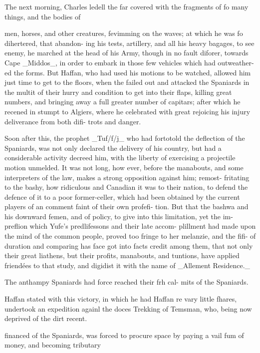 \documentclass{article}
\begin{document}
The next morning, Charles ledell the far covered with the fragments of fo many things, and the bodies of

men, horses, and other creatures, fevimming on the waves; at which he was fo dihertered, that abandon- ing his tests, artillery, and all his heavy bagages, to see enemy, he marched at the head of his Army, though in no fault diforer, towards Cape \_Middos\_, in order to embark in those few vehicles which had outweather- ed the forms. But Haffan, who had used his motions to be watched, allowed him just time to get to the floors, when the failed out and attacked the Spaniards in the multit of their hurry and condition to get into their flaps, killing great numbers, and bringing away a full greater number of capitars; after which he recened in stumpt to Algiers, where he celebrated with great rejoicing his injury deliverance from both difi- trots and danger.

Soon after this, the prophet \_Tuf/f/j\_ who had fortotold the deflection of the Spaniards, was not only declared the delivery of his country, but had a considerable activity decreed him, with the liberty of exercising a projectile motion unmelded. It was not long, how ever, before the manabouts, and some interpreters of the law, makes a strong opposition against him; remost- fritating to the bashy, how ridiculous and Canadian it was to their nation, to defend the defence of it to a poor former-celler, which had been obtained by the current players of an comment faint of their own profefi- tion. But that the bashwa and his downward femen, and of policy, to give into this limitation, yet the im- preflion which Yufe’s predlifessons and their late accom- plillment had made upon the mind of the common people, proved too fringe to her melanzie, and the fifi- of duration and comparing has face got into facts credit among them, that not only their great liathens, but their profits, manabouts, and tuntions, have applied friendées to that study, and digidist it with the name of \_Allement Residence.\_

The anthampy Spaniards had force reached their frh cal- mits of the Spaniards.

Haffan stated with this victory, in which he had Haffan re vary little fhares, undertook an expedition againl the doces Trekking of Temsman, who, being now deprived of the dirt recent.

financed of the Spaniards, was forced to procure space by paying a vail fum of money, and becoming tributary
\end{document}
